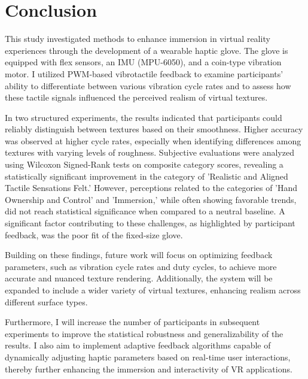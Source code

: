 \chapter{Conclusion} %

\label{Chapter6}

This study investigated methods to enhance immersion in virtual reality experiences through the development of a wearable haptic glove. The glove is equipped with flex sensors, an IMU (MPU-6050), and a coin-type vibration motor. I utilized PWM-based vibrotactile feedback to examine participants' ability to differentiate between various vibration cycle rates and to assess how these tactile signals influenced the perceived realism of virtual textures.

In two structured experiments, the results indicated that participants could reliably distinguish between textures based on their smoothness. Higher accuracy was observed at higher cycle rates, especially when identifying differences among textures with varying levels of roughness. Subjective evaluations were analyzed using Wilcoxon Signed-Rank tests on composite category scores, revealing a statistically significant improvement in the category of 'Realistic and Aligned Tactile Sensations Felt.' However, perceptions related to the categories of 'Hand Ownership and Control' and 'Immersion,' while often showing favorable trends, did not reach statistical significance when compared to a neutral baseline. A significant factor contributing to these challenges, as highlighted by participant feedback, was the poor fit of the fixed-size glove.

Building on these findings, future work will focus on optimizing feedback parameters, such as vibration cycle rates and duty cycles, to achieve more accurate and nuanced texture rendering. Additionally, the system will be expanded to include a wider variety of virtual textures, enhancing realism across different surface types. 

Furthermore, I will increase the number of participants in subsequent experiments to improve the statistical robustness and generalizability of the results. I also aim to implement adaptive feedback algorithms capable of dynamically adjusting haptic parameters based on real-time user interactions, thereby further enhancing the immersion and interactivity of VR applications.





